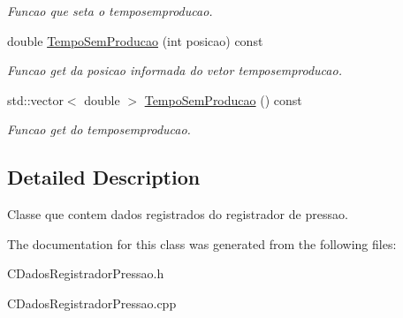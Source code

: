 \begin{DoxyCompactItemize}
\begin{DoxyCompactList}\small\item\em Funcao que seta o temposemproducao. \end{DoxyCompactList}\item 
\hypertarget{classCDadosRegistradorPressao_a2c04ed2464988fbbd4f7d2c9216bf575}{double \hyperlink{classCDadosRegistradorPressao_a2c04ed2464988fbbd4f7d2c9216bf575}{Tempo\-Sem\-Producao} (int posicao) const }\label{classCDadosRegistradorPressao_a2c04ed2464988fbbd4f7d2c9216bf575}

\begin{DoxyCompactList}\small\item\em Funcao get da posicao informada do vetor temposemproducao. \end{DoxyCompactList}\item 
\hypertarget{classCDadosRegistradorPressao_a6802a3ed2e5496132fbd11d26c4c611f}{std\-::vector$<$ double $>$ \hyperlink{classCDadosRegistradorPressao_a6802a3ed2e5496132fbd11d26c4c611f}{Tempo\-Sem\-Producao} () const }\label{classCDadosRegistradorPressao_a6802a3ed2e5496132fbd11d26c4c611f}

\begin{DoxyCompactList}\small\item\em Funcao get do temposemproducao. \end{DoxyCompactList}\end{DoxyCompactItemize}


\subsection{Detailed Description}
Classe que contem dados registrados do registrador de pressao. 

The documentation for this class was generated from the following files\-:\begin{DoxyCompactItemize}
\item 
C\-Dados\-Registrador\-Pressao.\-h\item 
C\-Dados\-Registrador\-Pressao.\-cpp\end{DoxyCompactItemize}
